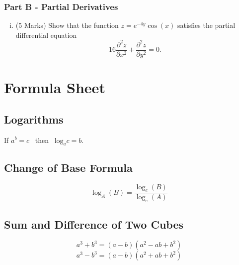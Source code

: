 \documentclass[a4paper,12pt]{article}
\begin{document}
\bigskip
\subsubsection*{Part B - Partial Derivatives}
\begin{enumerate}[(i)]
	
	\item (5 Marks)
	Show that the function $z=e^{-4y}\cos(x)$ satisfies the partial differential equation
	\[ 16\frac{\partial^2 z}{\partial x^2} + \frac{\partial^2 z}{\partial y^2} = 0. \]
\end{enumerate}
%
%	
%
%
%

\newpage
	\section*{Formula Sheet}
	
\subsection*{Logarithms}
If $a^b = c$ \, then \, $\mbox{log}_a c = b$.



\subsection*{Change of Base Formula}

\[ \log_A(B) = \frac{ \log_e(B) }{ \log_e(A) }  \]
	\subsection*{Sum and Difference of Two Cubes}
	\[ a^3 + b^3 = (a-b)(a^2 - ab + b^2)\]
	\[ a^3 - b^3 = (a-b)(a^2 + ab + b^2)\]
	
\end{document}
